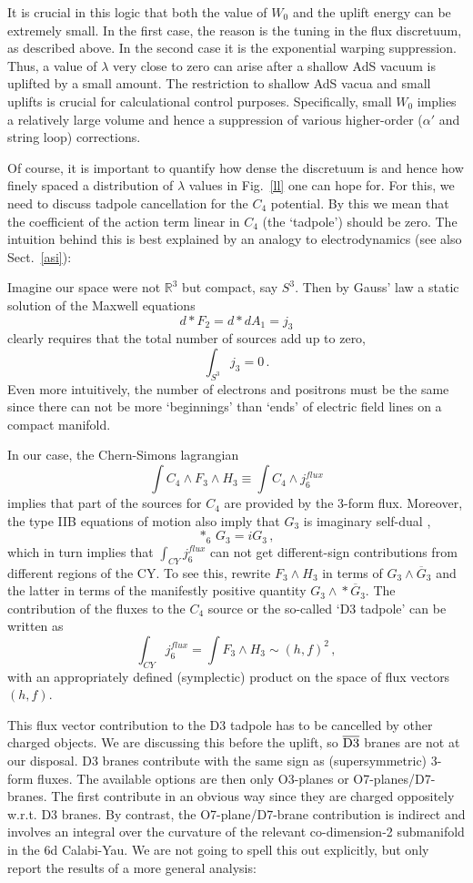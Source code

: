 \documentclass[12pt]{article}
\newcommand{\be}{\begin{equation}}
\newcommand{\ee}{\end{equation}}
\newcommand{\ol}{\overline}
\numberwithin{equation}{section}
\begin{document}
It is crucial in this logic that both the value of $W_0$ and the uplift energy can be extremely small. In the first case, the reason is the tuning in the flux discretuum, as described above. In the second case it is the exponential warping suppression. Thus, a value of $\lambda$ very close to zero can arise after a shallow AdS vacuum is uplifted by a small amount. The restriction to shallow AdS vacua and small uplifts is crucial for calculational control purposes. Specifically, small $W_0$ implies a relatively large volume and hence a suppression of various higher-order ($\alpha'$ and string loop) corrections.

Of course, it is important to quantify how dense the discretuum is and hence how finely spaced a distribution of $\lambda$ values in Fig.~\ref{ll} one can hope for. For this, we need to discuss tadpole cancellation for the $C_4$ potential. By this we mean that the coefficient of the action term linear in $C_4$ (the `tadpole') should be zero. The intuition behind this is best explained by an analogy to electrodynamics (see also Sect.~\ref{asi}): 

Imagine our space were not $\mathbb{R}^3$ but compact, say $S^3$. Then by Gauss' law a static solution of the Maxwell equations
\be
d * F_2=d * d A_1= j_3
\ee
clearly requires that the total number of sources add up to zero,
\be
\int_{S^3} j_3=0\,.
\ee
Even more intuitively, the number of electrons and positrons must be the same since there can not be more `beginnings' than `ends' of electric field lines on a compact manifold.

In our case, the Chern-Simons lagrangian 
\be
\int C_4\wedge F_3\wedge H_3\equiv \int C_4\wedge j^{flux}_6
\ee
implies that part of the sources for $C_4$ are provided by the 3-form flux. Moreover, the type IIB equations of motion also imply that $G_3$ is imaginary self-dual \cite{Giddings:2001yu},
\be
*_6\, G_3=iG_3\,,
\ee
which in turn implies that $\int_{CY}j^{flux}_6$ can not get different-sign contributions from different regions of the CY.
To see this, rewrite $F_3\wedge H_3$ in terms of $G_3\wedge\ol{G}_3$ and the latter in terms of the manifestly positive quantity $G_3\wedge\!*\ol{G}_3$.
The contribution of the fluxes to the $C_4$ source or the so-called `D3 tadpole' can be written as 
\be
\int_{CY}j^{flux}_6=\int F_3\wedge H_3 \sim (h,f)^2\,,
\ee
with an appropriately defined (symplectic) product on the space of flux vectors $(h,f)$.

This flux vector contribution to the D3 tadpole has to be cancelled by other charged objects. We are discussing this before the uplift, so $\ol{\rm D3}$ branes are not at our disposal. D3 branes contribute with the same sign as (supersymmetric) 3-form fluxes. The available options are then only O3-planes or O7-planes/D7-branes. The first contribute in an obvious way since they are charged oppositely w.r.t. D3 branes. By contrast, the O7-plane/D7-brane contribution is indirect and involves an integral over the curvature of the relevant co-dimension-2 submanifold in the 6d Calabi-Yau. We are not going to spell this out explicitly, but only report the results of a more general analysis:
\end{document}
